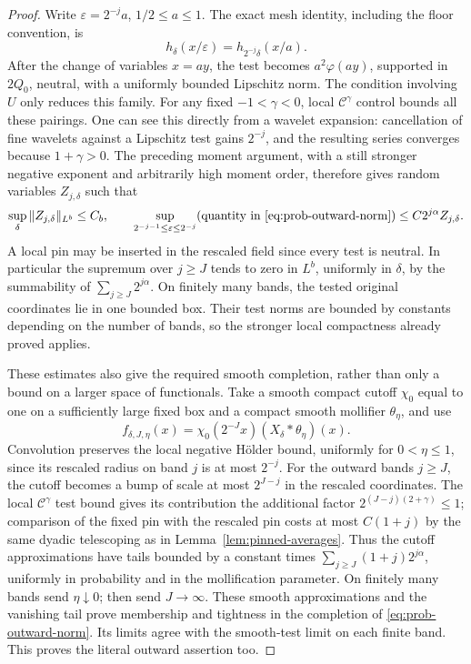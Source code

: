 \begin{proof}
Write \(\varepsilon=2^{-j}a\), \(1/2\le a\le1\).
The exact mesh identity, including the floor convention, is
\[
 h_\delta(x/\varepsilon)=h_{2^{-j}\delta}(x/a).
\]
After the change of variables \(x=ay\), the test becomes
\(a^2\varphi(ay)\), supported in \(2Q_0\), neutral, with a uniformly
bounded Lipschitz norm. The condition involving \(U\) only reduces this
family. For any fixed \(-1<\gamma<0\), local
\(\mathcal C^\gamma\) control bounds all these pairings. One can see
this directly from a wavelet expansion: cancellation of fine wavelets
against a Lipschitz test gains \(2^{-j}\), and the resulting series
converges because \(1+\gamma>0\).
The preceding moment argument, with a still stronger negative exponent
and arbitrarily high moment order, therefore gives random variables
\(Z_{j,\delta}\) such that
\[
 \sup_\delta\|Z_{j,\delta}\|_{L^b}\le C_b,
 \qquad
 \sup_{2^{-j-1}\le\varepsilon\le2^{-j}}(\text{quantity in }
             \eqref{eq:prob-outward-norm})
       \le C2^{j\alpha}Z_{j,\delta}.
\]
A local pin may be inserted in the rescaled field since every test is
neutral. In particular the supremum over \(j\ge J\) tends to zero in
\(L^b\), uniformly in \(\delta\), by the summability of
\(\sum_{j\ge J}2^{j\alpha}\).
On finitely many bands, the tested original coordinates lie in one
bounded box. Their test norms are bounded by constants depending on the
number of bands, so the stronger local compactness already proved applies.

These estimates also give the required smooth completion, rather than
only a bound on a larger space of functionals. Take a smooth compact
cutoff \(\chi_0\) equal to one on a sufficiently large fixed box and a
compact smooth mollifier \(\theta_\eta\), and use
\[
 f_{\delta,J,\eta}(x)
       =\chi_0(2^{-J}x)(X_\delta*\theta_\eta)(x).
\]
Convolution preserves the local negative Hölder bound, uniformly for
\(0<\eta\le1\), since its rescaled radius on band \(j\) is at most
\(2^{-j}\). For the outward bands \(j\ge J\), the cutoff becomes a bump
of scale at most \(2^{J-j}\) in the rescaled coordinates. The local
\(\mathcal C^\gamma\) test bound gives its contribution the additional
factor \(2^{(J-j)(2+\gamma)}\le1\); comparison of the fixed pin with the
rescaled pin costs at most \(C(1+j)\) by the same dyadic telescoping as
in Lemma~\ref{lem:pinned-averages}. Thus the cutoff approximations have
tails bounded by a constant times
\(\sum_{j\ge J}(1+j)2^{j\alpha}\), uniformly in probability and in the
mollification parameter. On finitely many bands send \(\eta\downarrow0\);
then send \(J\to\infty\). These smooth approximations and the vanishing tail prove
membership and tightness in the completion of
\eqref{eq:prob-outward-norm}. Its limits agree with the smooth-test limit
on each finite band. This proves the literal outward assertion too.
\end{proof}

